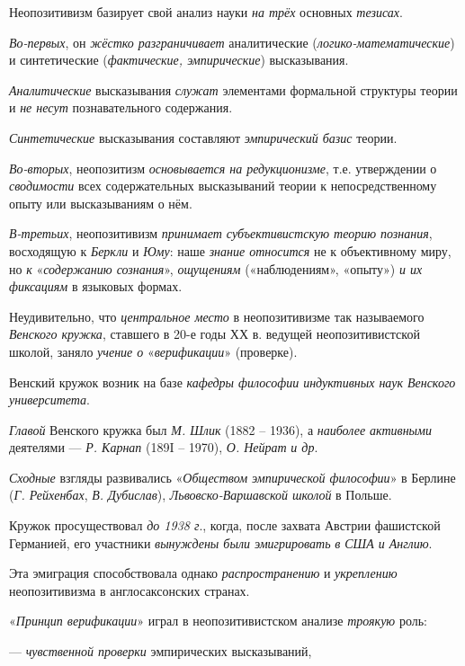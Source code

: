 \documentclass[a4paper,14pt,russian]{extreport}
\begin{document}
Неопозитивизм базирует свой анализ науки \emph{на трёх} основных \emph{тезисах}.

\emph{Во-первых}, он \emph{жёстко разграничивает} аналитические (\emph{логико-математические}) и синтетические (\emph{фактические, эмпирические}) высказывания.

\emph{Аналитические} высказывания \emph{служат} элементами формальной структуры теории и \emph{не несут} познавательного содержания.

\emph{Синтетические} высказывания составляют \emph{эмпирический базис} теории.

\emph{Во-вторых}, неопозитизм \emph{основывается на редукционизме}, т.е. утверждении о \emph{сводимости} всех содержательных высказываний теории к непосредственному опыту или высказываниям о нём.

\emph{В-третьих}, неопозитивизм \emph{принимает субъективистскую теорию познания}, восходящую к \emph{Беркли} и \emph{Юму}: наше \emph{знание относится} не к объективному миру, но \emph{к} «\emph{содержанию сознания}», \emph{ощущениям} («наблюдениям», «опыту») \emph{и их фиксациям} в языковых формах.

Неудивительно, что \emph{центральное место} в неопозитивизме так называемого \emph{Венского кружка}, ставшего в 20-е годы ХХ в. ведущей неопозитивистской школой, заняло \emph{учение о} «\emph{верификации}» (проверке).

Венский кружок возник на базе \emph{кафедры философии индуктивных наук Венского университета}.

\emph{Главой} Венского кружка был \emph{М. Шлик} (1882 -- 1936), а \emph{наиболее активными} деятелями --- \emph{Р. Карнап} (189I -- 1970), \emph{О. Нейрат} \emph{и др}.

\emph{Сходные} взгляды развивались «\emph{Обществом эмпирической философии}» в Берлине (\emph{Г. Рейхенбах}, \emph{В. Дубислав}), \emph{Львовско-Варшавской школой} в Польше.

Кружок просуществовал \emph{до 1938 г}., когда, после захвата Австрии фашистской Германией, его участники \emph{вынуждены были эмигрировать} \emph{в США и Англию}.

Эта эмиграция способствовала однако \emph{распространению} и \emph{укреплению} неопозитивизма в англосаксонских странах.

«\emph{Принцип верификации}» играл в неопозитивистском анализе \emph{троякую} роль:

--- \emph{чувственной проверки} эмпирических высказываний,
\end{document}
